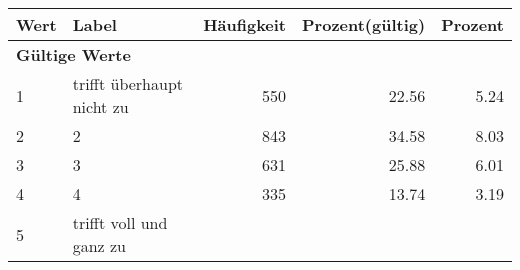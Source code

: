      \begin{longtable}{lXrrr}
     \toprule
     \textbf{Wert} & \textbf{Label} & \textbf{Häufigkeit} & \textbf{Prozent(gültig)} & \textbf{Prozent} \\
     \endhead
     \midrule
     \multicolumn{5}{l}{\textbf{Gültige Werte}}\\

     1 &
     \multicolumn{1}{X}{ trifft überhaupt nicht zu   } &


       \num{550} &
       \num[round-mode=places,round-precision=2]{22.56} &
         \num[round-mode=places,round-precision=2]{5.24} \\

     2 &
     \multicolumn{1}{X}{ 2   } &


       \num{843} &
       \num[round-mode=places,round-precision=2]{34.58} &
         \num[round-mode=places,round-precision=2]{8.03} \\

     3 &
     \multicolumn{1}{X}{ 3   } &


       \num{631} &
       \num[round-mode=places,round-precision=2]{25.88} &
         \num[round-mode=places,round-precision=2]{6.01} \\

     4 &
     \multicolumn{1}{X}{ 4   } &


       \num{335} &
       \num[round-mode=places,round-precision=2]{13.74} &
         \num[round-mode=places,round-precision=2]{3.19} \\

     5 &
     \multicolumn{1}{X}{ trifft voll und ganz zu   } &



\end{longtable}
